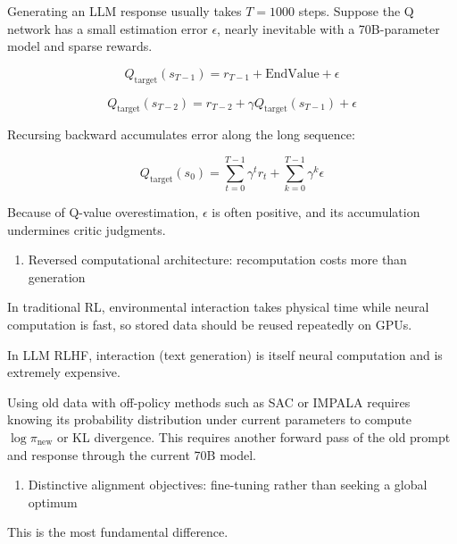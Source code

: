 Generating an LLM response usually takes \(T=1000\) steps. Suppose the Q network has a small estimation error \(\epsilon\), nearly inevitable with a 70B-parameter model and sparse rewards.

\[
Q_{\mathrm{target}}(s_{T-1})
=
r_{T-1}
+\mathrm{EndValue}
+\epsilon
\]

\[
Q_{\mathrm{target}}(s_{T-2})
=
r_{T-2}
+\gamma Q_{\mathrm{target}}(s_{T-1})
+\epsilon
\]

Recursing backward accumulates error along the long sequence:

\[
Q_{\mathrm{target}}(s_0)
=
\sum_{t=0}^{T-1}\gamma^t r_t
+
\sum_{k=0}^{T-1}\gamma^k \epsilon
\]

Because of Q-value overestimation, \(\epsilon\) is often positive, and its accumulation undermines critic judgments.

\begin{enumerate}
\def\labelenumi{\arabic{enumi}.}
\setcounter{enumi}{1}
\tightlist
\item
  Reversed computational architecture: recomputation costs more than generation
\end{enumerate}

In traditional RL, environmental interaction takes physical time while neural computation is fast, so stored data should be reused repeatedly on GPUs.

In LLM RLHF, interaction (text generation) is itself neural computation and is extremely expensive.

Using old data with off-policy methods such as SAC or IMPALA requires knowing its probability distribution under current parameters to compute \(\log\pi_{\mathrm{new}}\) or KL divergence. This requires another forward pass of the old prompt and response through the current 70B model.

\begin{enumerate}
\def\labelenumi{\arabic{enumi}.}
\setcounter{enumi}{2}
\tightlist
\item
  Distinctive alignment objectives: fine-tuning rather than seeking a global optimum
\end{enumerate}

This is the most fundamental difference.


